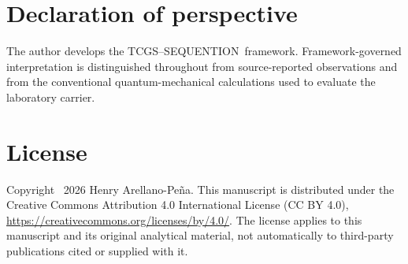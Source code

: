 \documentclass[11pt,a4paper]{article}
\theoremstyle{definition}
\theoremstyle{remark}
\newcommand{\TCGS}{TCGS--SEQUENTION}
\begin{document}
\section*{Declaration of perspective}
The author develops the \TCGS\ framework. Framework-governed interpretation is distinguished throughout from source-reported observations and from the conventional quantum-mechanical calculations used to evaluate the laboratory carrier.

\section*{License}
Copyright \textcopyright\ 2026 Henry Arellano-Pe\~na. This manuscript is distributed under the Creative Commons Attribution 4.0 International License (CC BY 4.0), \url{https://creativecommons.org/licenses/by/4.0/}. The license applies to this manuscript and its original analytical material, not automatically to third-party publications cited or supplied with it.
\end{document}
